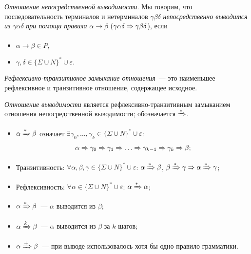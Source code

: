 \begin{definition}
    \label{def derivability in CFG}
    \emph{Отношение непосредственной выводимости}. Мы говорим, что последовательность терминалов и нетерминалов $\gamma \beta \delta$ \emph{непосредственно выводится из} $\gamma \alpha \delta$ \emph{при помощи правила} $\alpha \rightarrow \beta$ ($\gamma \alpha \delta \derives[] \gamma \beta \delta$), если
    \begin{itemize}
        \item $\alpha \rightarrow \beta \in P$,
        \item $\gamma, \delta \in \{\Sigma \cup N\}^* \cup {\varepsilon}$.
    \end{itemize}
\end{definition}

\begin{definition}
    \emph{Рефлексивно-транзитивное замыкание отношения}~--- это наименьшее рефлексивное и транзитивное отношение, содержащее исходное.
\end{definition}

\begin{definition}
    \emph{Отношение выводимости} является рефлексивно-транзитивным замыканием отношения непосредственной выводимости; обозначается $\derives$.
    \begin{itemize}
        \item $\alpha \derives \beta$ означает $\exists \gamma_0, \dots, \gamma_k \in \{\Sigma \cup N\}^* \cup {\varepsilon}$:
              \[ \alpha \derives[] \gamma_0 \derives[] \gamma_1 \derives[] \dots \derives[] \gamma_{k-1} \derives[] \gamma_{k} \derives[] \beta;\]
        \item Транзитивность: $\forall \alpha, \beta, \gamma \in \{\Sigma \cup N\}^* \cup {\varepsilon}$: $\alpha \derives \beta$, $\beta \derives \gamma \derives[] \alpha \derives \gamma$;
        \item Рефлексивность: $\forall \alpha \in \{\Sigma \cup N\}^* \cup {\varepsilon}$: $\alpha \derives \alpha$;
        \item $\alpha \derives \beta$~--- $\alpha$ выводится из $\beta$;
        \item $\alpha \derives[k] \beta$~--- $\alpha$ выводится из $\beta$ за $k$ шагов;
        \item $\alpha \derives[+] \beta$~--- при выводе использовалось хотя бы одно правило грамматики.
    \end{itemize}
\end{definition}

